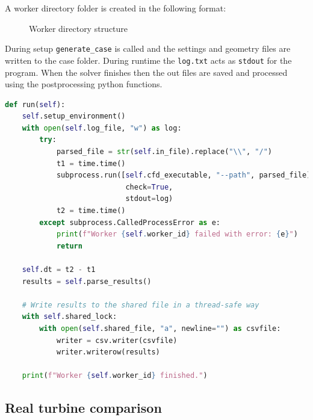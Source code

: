 \documentclass{article}
\begin{document}
A worker directory folder is created in the following format:
\begin{figure}[H]
    \caption{Worker directory structure}
    \label{fig:worker_dir}
\end{figure}

During setup \texttt{generate\_case} is called and the settings and geometry files are written to the case folder.
During runtime the \texttt{log.txt} acts as \texttt{stdout} for the program.
When the solver finishes then the out files are saved and processed using the postprocessing python functions.

\begin{lstlisting}[language=Python]
def run(self):
    self.setup_environment()
    with open(self.log_file, "w") as log:
        try:
            parsed_file = str(self.in_file).replace("\\", "/")
            t1 = time.time()
            subprocess.run([self.cfd_executable, "--path", parsed_file],
                            check=True,
                            stdout=log)
            t2 = time.time()
        except subprocess.CalledProcessError as e:
            print(f"Worker {self.worker_id} failed with error: {e}")
            return

    self.dt = t2 - t1
    results = self.parse_results()

    # Write results to the shared file in a thread-safe way
    with self.shared_lock:
        with open(self.shared_file, "a", newline="") as csvfile:
            writer = csv.writer(csvfile)
            writer.writerow(results)

    print(f"Worker {self.worker_id} finished.")
\end{lstlisting}

\subsection{Real turbine comparison}

\end{document}
